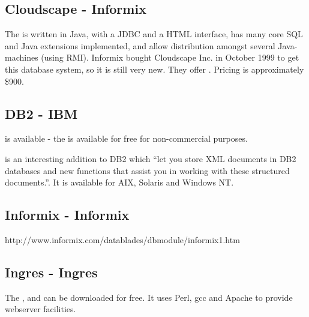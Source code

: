 \subsection{Cloudscape - Informix}
\label{sec:cloudscape}

The
 is written in Java, with a JDBC and a HTML interface, has
many core SQL and Java extensions implemented, and allow distribution
amongst several Java-machines (using RMI).  Informix bought Cloudscape
Inc. in October 1999 to get this database system, so it is still very
new.  They offer
.  Pricing is approximately \$900.


\subsection{DB2 - IBM}
\label{sec:db2}

is available - the  is available
for free for non-commercial purposes.  

 is an interesting addition to DB2 which ``let you
store XML documents in DB2 databases and new functions that assist you
in working with these structured documents.''.  It is available for
AIX, Solaris and Windows NT. 

  

\subsection{Informix - Informix}
\label{sec:informix}

http://www.informix.com/datablades/dbmodule/informix1.htm

 
\subsection{Ingres - Ingres}
\label{sec:ingres}

The
, and can be downloaded for
free.  It uses Perl, gcc and Apache to provide webserver facilities.


